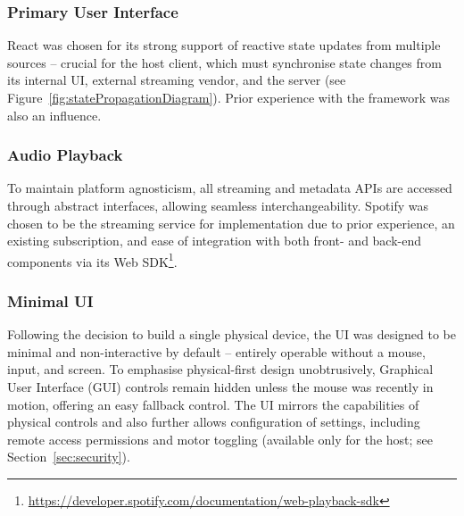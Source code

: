             \subsubsection{Primary User Interface}
    
                React was chosen for its strong support of reactive state updates from multiple sources -- crucial for the host client, which must synchronise state changes from its internal UI, external streaming vendor, and the server (see Figure~\ref{fig:statePropagationDiagram}). Prior experience with the framework was also an influence.
            
            \subsubsection{Audio Playback}
    
                To maintain platform agnosticism, all streaming and metadata APIs are accessed through abstract interfaces, allowing seamless interchangeability. Spotify was chosen to be the streaming service for implementation due to prior experience, an existing subscription, and ease of integration with both front- and back-end components via its Web SDK\footnote{\url{https://developer.spotify.com/documentation/web-playback-sdk}}.
    
            \subsubsection{Minimal UI}
    
            Following the decision to build a single physical device, the UI was designed to be minimal and non-interactive by default -- entirely operable without a mouse, input, and screen. To emphasise physical-first design unobtrusively, Graphical User Interface (GUI) controls remain hidden unless the mouse was recently in motion, offering an easy fallback control. The UI mirrors the capabilities of physical controls and also further allows configuration of settings, including remote access permissions and motor toggling (available only for the host; see Section~\ref{sec:security}).
     
